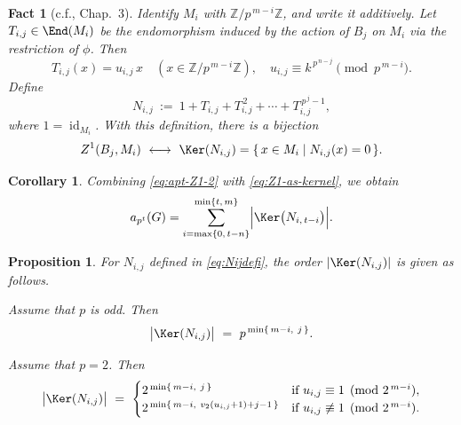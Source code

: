 \documentclass[onecolumn]{article}
\numberwithin{equation}{section}
\theoremstyle{mytheoremstyle}
\newtheorem{prop}[thm]{Proposition}
\newtheorem{fac}[thm]{Fact}
\newtheorem{cor}[thm]{Corollary}
\DeclareMathOperator{\id}{\mathrm{id}}
\begin{document}
\begin{fac}[c.f.\cite{Robinson1996}, Chap.~3]\label{fac:Z1-kernel-Nij}
Identify $M_i$ with $\mathbb{Z}/p^{\,m-i}\mathbb{Z}$, and write it additively.
Let $T_{i,j}\in\End(M_i)$ be the endomorphism induced by the action of $B_j$ on $M_i$
via the restriction of $\phi$.
Then
\begin{equation}\label{eq:Tijformula}
T_{i,j}(x)=u_{i,j}\,x\quad(x\in\mathbb{Z}/p^{\,m-i}\mathbb{Z}),\quad
u_{i,j}\equiv k^{\,p^{\,n-j}}\pmod{p^{\,m-i}}.
\end{equation}
Define
\begin{equation}\label{eq:Nijdefi}
N_{i,j}\ :=\ 1+T_{i,j}+T_{i,j}^{\,2}+\cdots+T_{i,j}^{\,p^{\,j}-1},
\end{equation}
where $1=\id_{M_{i}}$.
With this definition, there is a bijection
\begin{equation}\label{eq:Z1-as-kernel}
Z^{1}(B_j,M_i)\ \longleftrightarrow\ \Ker(N_{i,j})
=\{\,x\in M_i\mid N_{i,j}(x)=0\,\}.
\end{equation}
\end{fac}



\begin{cor}\label{cor:aptG-KerNij-eq}
Combining \eqref{eq:apt-Z1-2}
with \eqref{eq:Z1-as-kernel}, we obtain
\[
a_{p^{t}}(G)
=
\sum_{i=\max\{0,\,t-n\}}^{\min\{t,\,m\}}
\Bigl|\Ker\bigl(N_{i,\,t-i}\bigr)\Bigr|.\]
\end{cor}

\begin{prop}\label{prop:KerNij-podd-2-case}
For $N_{i,j}$ defined in \eqref{eq:Nijdefi}, the order $|\Ker(N_{i,j})|$ is given as follows.

Assume that $p$ is odd. Then
\[
  \bigl|\Ker(N_{i,j})\bigr|
  \ =\ p^{\,\min\{\,m-i,\ j\,\}}.
\]

Assume that $p=2$. Then
\[
  \bigl|\Ker(N_{i,j})\bigr|
  \ =\
  \begin{cases}
    2^{\,\min\{\,m-i,\ j\,\}} &
      \textup{if } u_{i,j}\equiv 1\pmod{2^{\,m-i}},\\
    2^{\,\min\{\,m-i,\ v_2(u_{i,j}+1)+j-1\,\}} &
      \textup{if } u_{i,j}\not\equiv 1\pmod{2^{\,m-i}}.
  \end{cases}
\]
\end{prop}
\end{document}
